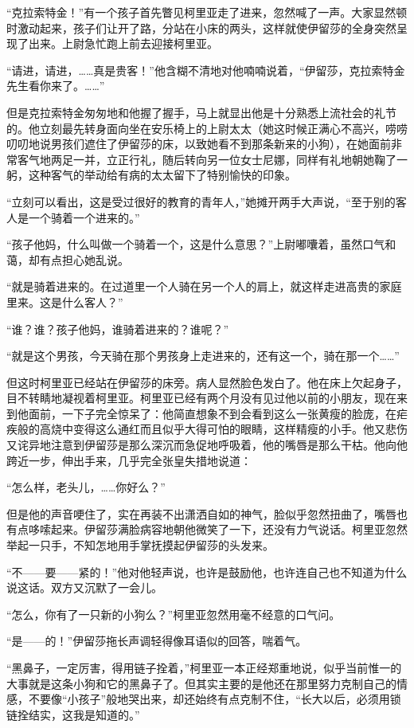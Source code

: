 \par “克拉索特金！”有一个孩子首先瞥见柯里亚走了进来，忽然喊了一声。大家显然顿时激动起来，孩子们让开了路，分站在小床的两头，这样就使伊留莎的全身突然呈现了出来。上尉急忙跑上前去迎接柯里亚。
\par “请进，请进，……真是贵客！”他含糊不清地对他喃喃说着，“伊留莎，克拉索特金先生看你来了。……”
\par 但是克拉索特金匆匆地和他握了握手，马上就显出他是十分熟悉上流社会的礼节的。他立刻最先转身面向坐在安乐椅上的上尉太太（她这时候正满心不高兴，唠唠叨叨地说男孩们遮住了伊留莎的床，以致她看不到那条新来的小狗），在她面前非常客气地两足一并，立正行礼，随后转向另一位女士尼娜，同样有礼地朝她鞠了一躬，这种客气的举动给有病的太太留下了特别愉快的印象。
\par “立刻可以看出，这是受过很好的教育的青年人，”她摊开两手大声说，“至于别的客人是一个骑着一个进来的。”
\par “孩子他妈，什么叫做一个骑着一个，这是什么意思？”上尉嘟囔着，虽然口气和蔼，却有点担心她乱说。
\par “就是骑着进来的。在过道里一个人骑在另一个人的肩上，就这样走进高贵的家庭里来。这是什么客人？”
\par “谁？谁？孩子他妈，谁骑着进来的？谁呢？”
\par “就是这个男孩，今天骑在那个男孩身上走进来的，还有这一个，骑在那一个……”
\par 但这时柯里亚已经站在伊留莎的床旁。病人显然脸色发白了。他在床上欠起身子，目不转睛地凝视着柯里亚。柯里亚已经有两个月没有见过他以前的小朋友，现在来到他面前，一下子完全惊呆了：他简直想象不到会看到这么一张黄瘦的脸庞，在疟疾般的高烧中变得这么通红而且似乎大得可怕的眼睛，这样精瘦的小手。他又悲伤又诧异地注意到伊留莎是那么深沉而急促地呼吸着，他的嘴唇是那么干枯。他向他跨近一步，伸出手来，几乎完全张皇失措地说道：
\par “怎么样，老头儿，……你好么？”
\par 但是他的声音哽住了，实在再装不出潇洒自如的神气，脸似乎忽然扭曲了，嘴唇也有点哆嗦起来。伊留莎满脸病容地朝他微笑了一下，还没有力气说话。柯里亚忽然举起一只手，不知怎地用手掌抚摸起伊留莎的头发来。
\par “不——要——紧的！”他对他轻声说，也许是鼓励他，也许连自己也不知道为什么说这话。双方又沉默了一会儿。
\par “怎么，你有了一只新的小狗么？”柯里亚忽然用毫不经意的口气问。
\par “是——的！”伊留莎拖长声调轻得像耳语似的回答，喘着气。
\par “黑鼻子，一定厉害，得用链子拴着，”柯里亚一本正经郑重地说，似乎当前惟一的大事就是这条小狗和它的黑鼻子了。但其实主要的是他还在那里努力克制自己的情感，不要像“小孩子”般地哭出来，却还始终有点克制不住，“长大以后，必须用锁链拴结实，这我是知道的。”
